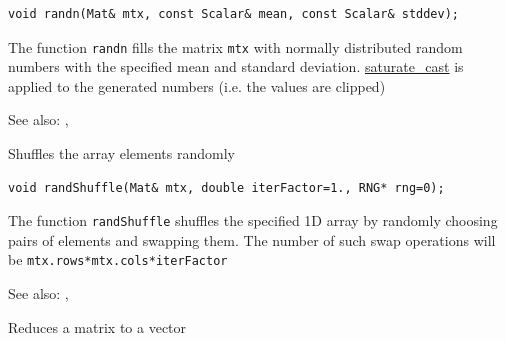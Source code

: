 \begin{lstlisting}
void randn(Mat& mtx, const Scalar& mean, const Scalar& stddev);
\end{lstlisting}
\begin{description}
\end{description}

The function \texttt{randn} fills the matrix \texttt{mtx} with normally distributed random numbers with the specified mean and standard deviation. \hyperref[saturatecast]{saturate\_cast} is applied to the generated numbers (i.e. the values are clipped)

See also: , 

\label{randShuffle}
Shuffles the array elements randomly

\begin{lstlisting}
void randShuffle(Mat& mtx, double iterFactor=1., RNG* rng=0);
\end{lstlisting}
\begin{description}
\end{description}

The function \texttt{randShuffle} shuffles the specified 1D array by randomly choosing pairs of elements and swapping them. The number of such swap operations will be \texttt{mtx.rows*mtx.cols*iterFactor}

See also: , 

\label{reduce}
Reduces a matrix to a vector

